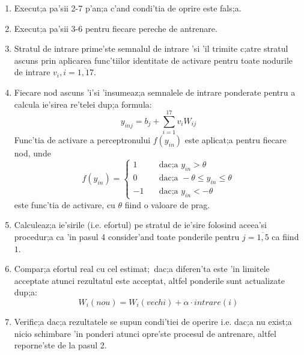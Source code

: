 \begin{enumerate}
\item Execut;a pa'sii 2-7 p'an;a c'and condi'tia de oprire este fals;a.
\item Execut;a pa'sii 3-6 pentru fiecare pereche de antrenare.
\item Stratul de intrare prime'ste semnalul de intrare 'si 'il trimite c;atre stratul ascuns prin aplicarea func'tiilor identitate de activare pentru toate nodurile de intrare $v_{i}, i = \overline{1, 17}$.
\item Fiecare nod ascuns 'i'si 'insumeaz;a semnalele de intrare ponderate pentru a calcula ie'sirea re'telei dup;a formula:
\begin{equation} y_{in j} = b_{j} + \displaystyle\sum_{i=1}^{17} v_{i}W_{ij} \end{equation}
Func'tia de activare a perceptronului $f(y_{in})$ este aplicat;a pentru fiecare nod, unde 
\begin{equation}
f(y_{in}) = \begin{cases}
		1  & \quad \text{dac;a } y_{in} > \theta \\
		0  & \quad \text{dac;a } -\theta \leq y_{in} \leq \theta\\
		-1 & \quad \text{dac;a } y_{in} < -\theta
\end{cases}
\end{equation}
este func'tia de activare, cu $\theta$ fiind o valoare de prag.
\item Calculeaz;a ie'sirile (i.e. efortul) pe stratul de ie'sire folosind aceea'si procedur;a ca 'in pasul 4 consider'and toate ponderile pentru $j = \overline{1, 5}$ ca fiind $1$.
\item Compar;a efortul real cu cel estimat;\ dac;a diferen'ta este 'in limitele acceptate atunci rezultatul este acceptat, altfel ponderile sunt actualizate dup;a:
\begin{equation}
W_{i}(nou) = W_{i}(vechi) + \alpha \cdot intrare(i)
\end{equation}
\item Verific;a dac;a rezultatele se supun condi'tiei de operire i.e. dac;a nu exist;a nicio schimbare 'in ponderi atunci opre'ste procesul de antrenare, altfel reporne'ste de la pasul 2.
\end{enumerate}

